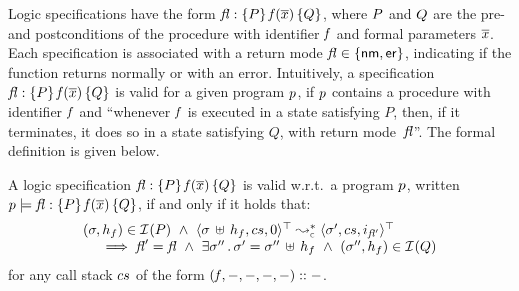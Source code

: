 \jsil Logic specifications have the form ${\mathit{fl}} : \{ P \} \, \mathit{f}(\overline{x}) \, \{ Q \}$, where $P$ and $Q$ are the 
pre- and postconditions of the procedure with identifier $\mathit{f}$ and formal parameters $\overline{x}$. 
Each specification is associated with a return mode $\mathit{fl} \in \{ {\sf nm}, {\sf er} \}$, indicating if the function
 returns normally or with an error. 
 Intuitively, a specification ${\mathit{fl}} : \{ P \} \, \mathit{f}(\overline{x}) \, \{ Q \}$ is 
valid for a given \jsil program $p$, if $p$ contains a procedure with identifier 
$\mathit{f}$ and ``whenever $\mathit{f}$ is executed in a state satisfying $P$, then, 
if it terminates, it does so in a state satisfying $Q$, with return mode~$\mathit{fl}$''.
The formal definition is given below. 


\begin{definition}
A \jsil logic specification ${\mathit{fl}} : \{ P \} \, \mathit{f}(\overline{x}) \, \{ Q \}$ is valid w.r.t.~a program 
$p$, written $p \models {\ensuremath{\mathit{fl}}} : \{ P \} \, \mathit{f}(\overline{x}) \, \{ Q \}$, if and only if it holds that: 
$$
\begin{array}{l}
   (\jstate, \heap_f) \in \interpret{}{}(P) 
   \ \wedge \ 
    \transabssemrule{\jstate \dunion \heap_f, \cs, 0}{\jstate', \cs, i_{\flag'}}{\top}{\top}{\concrete} \\ \quad \
   \implies
      \flag' = \flag \ \wedge \ \exists \jstate'' \, . \, \jstate' = \jstate'' \dunion \heap_f
          \ \wedge \   (\jstate'', \heap_f) \in \interpret{}{}(Q) 
\end{array}
$$
for any call stack $cs$ of the form $(\mathit{f}, -, -, -, -) :: -$. 
\end{definition}


